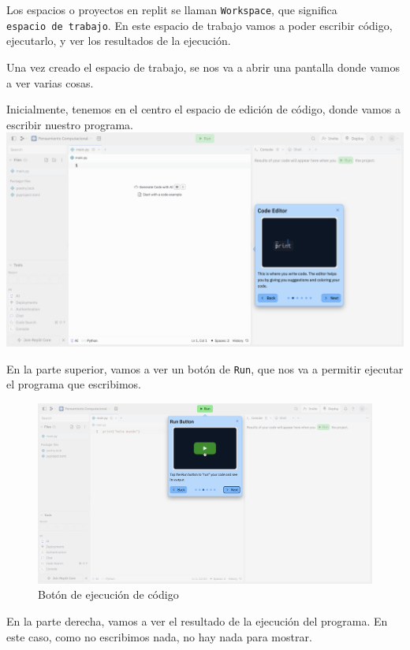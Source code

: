 \documentclass[
  letterpaper,
  DIV=11,
  numbers=noendperiod]{scrreprt}
\begin{document}
Los espacios o proyectos en replit se llaman \texttt{Workspace}, que
significa \texttt{espacio\ de\ trabajo}. En este espacio de trabajo
vamos a poder escribir código, ejecutarlo, y ver los resultados de la
ejecución.

Una vez creado el espacio de trabajo, se nos va a abrir una pantalla
donde vamos a ver varias cosas.

Inicialmente, tenemos en el centro el espacio de edición de código,
donde vamos a escribir nuestro programa.
\includegraphics{./imgs/unidad_1/replit_workspace1.png}

En la parte superior, vamos a ver un botón de \texttt{Run}, que nos va a
permitir ejecutar el programa que escribimos.

\begin{figure}

{\centering \includegraphics{./imgs/unidad_1/replit_workspace2.png}

}

\caption{Botón de ejecución de código}

\end{figure}

En la parte derecha, vamos a ver el resultado de la ejecución del
programa. En este caso, como no escribimos nada, no hay nada para
mostrar.
\end{document}
